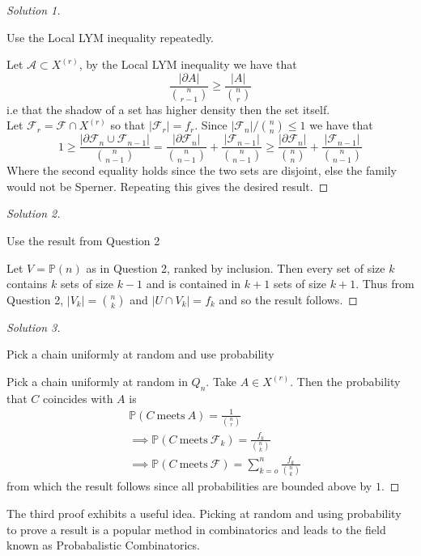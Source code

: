 \documentclass[a4paper]{article}
\newcommand{\shadow}{\partial}
\renewcommand{\P}{\mathbb{P}}
\begin{document}
\begin{proof}[Solution 1]
  \begin{idea}
    Use the Local LYM inequality repeatedly.
  \end{idea}
  Let $\mathcal{A} \subset X^{(r)}$, by the Local LYM inequality we have that
  \[\frac{|\shadow{A}|}{{n \choose r-1}} \geq \frac{|A|}{{n \choose r}} \]
  i.e that the shadow of a set has higher density then the set itself.\\
  Let $\mathcal{F}_r = \mathcal{F} \cap X^{(r)}$ so that $|\mathcal{F}_r| = f_r$. Since $|\mathcal{F}_n| / {n \choose n} \leq 1$ we have that
  \[1 \geq \frac{|\shadow{\mathcal{F}_n} \cup \mathcal{F}_{n-1}|}{{n \choose
        n-1}} = \frac{|\shadow{\mathcal{F}_n}|}{{n \choose n-1}} +
    \frac{|\mathcal{F}_{n-1}|}{{n \choose n-1}} \geq \frac{|\shadow{\mathcal{F}_n}|}{{n \choose n}} +
    \frac{|\mathcal{F}_{n-1}|}{{n \choose n-1}} \]
  Where the second equality holds since the two sets are disjoint, else the
  family would not be Sperner. Repeating this gives the desired result.
\end{proof}

\begin{proof}[Solution 2]
  \begin{idea}
    Use the result from Question 2
  \end{idea}
  Let $V = \P(n)$ as in Question 2, ranked by inclusion. Then every set of size
  $k$ contains $k$ sets of size $k-1$ and is contained in $k+1$ sets of size
  $k+1$. Thus from Question 2, $|V_k| = {n \choose k}$ and $| U \cap V_k| = f_k$
  and so the result follows.
\end{proof}
\begin{proof}[Solution 3]
  \begin{idea}
    Pick a chain uniformly at random and use probability
  \end{idea}

  Pick a chain uniformly at random in $Q_n$. Take $A \in X^{(r)}$. Then the
  probability that $C$ coincides with $A$ is
  \begin{align}
    &\P(C \ \text{meets} \ A) = \frac{1}{{n \choose r}}\\
    &\implies \P(C \ \text{meets} \ \mathcal{F}_k) = \frac{f_k}{{n \choose k}}\\
    &\implies \P(C \ \text{meets} \ \mathcal{F}) = \sum_{k=o}^n \frac{f_k}{{n \choose k}}
  \end{align}
  from which the result follows since all probabilities are bounded above by
  $1$.
\end{proof}
\begin{remark}
  The third proof exhibits a useful idea. Picking at random and using
  probability to prove a result is a popular method in combinatorics and leads
  to the field known as Probabalistic Combinatorics.
\end{remark}
\end{document}
